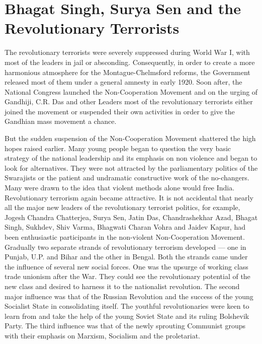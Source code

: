 \chapter[The Revolutionary Terrorist]{Bhagat Singh, Surya Sen and the Revolutionary Terrorists}
\begin{multicols}{2}

The revolutionary terrorists were severely suppressed during World War I, with most of the leaders in jail or absconding. Consequently, in order to create a more harmonious atmosphere for the Montague-Chelmsford reforms, the Government released most of them under a general amnesty in early 1920. Soon after, the National Congress launched the Non-Cooperation Movement and on the urging of Gandhiji, C.R. Das and other Leaders most of the revolutionary terrorists either joined the movement or suspended their own activities in order to give the Gandhian mass movement a chance.

But the sudden suspension of the Non-Cooperation Movement shattered the high hopes raised earlier. Many young people began to question the very basic strategy of the national leadership and its emphasis on non violence and began to look for alternatives. They were not attracted by the parliamentary politics of the Swarajists or the patient and undramatic constructive work of the no-changers. Many were drawn to the idea that violent methods alone would free India. Revolutionary terrorism again became attractive. It is not accidental that nearly all the major new leaders of the revolutionary terrorist politics, for example, Jogesh Chandra Chatterjea, Surya Sen, Jatin Das, Chandrashekhar Azad, Bhagat Singh, Sukhdev, Shiv Varma, Bhagwati Charan Vohra and Jaidev Kapur, had been enthusiastic participants in the non-violent Non-Cooperation Movement. Gradually two separate strands of revolutionary terrorism developed --- one in Punjab, U.P. and Bihar and the other in Bengal. Both the strands came under the influence of several new social forces. One was the upsurge of working class trade unionism after the War. They could see the revolutionary potential of the new class and desired to harness it to the nationalist revolution. The second major influence was that of the Russian Revolution and the success of the young Socialist State in consolidating itself. The youthful revolutionaries were keen to learn from and take the help of the young Soviet State and its ruling Bolshevik Party. The third influence was that of the newly sprouting Communist groups with their emphasis on Marxism, Socialism and the proletariat.


\end{multicols}
